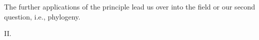 \documentclass[11pt,twoside,a4paper]{article}
\begin{document}
\begin{enumerate}
	The further applications of the principle lead us over into the field or our second question, i.e., phylogeny. 
\end{enumerate}

\begin{center} \large{II.} \end{center}

% 

\end{document}
